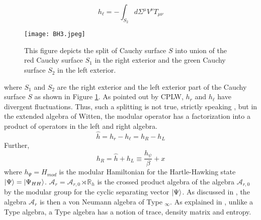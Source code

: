 \documentclass[12pt]{article}
\DeclarePairedDelimiter\ket{\lvert}{\rangle}
\newcommand{\RomanNumeralCaps}[1]
    {\MakeUppercase{\romannumeral #1}}
\begin{document}
 \begin{equation}\label{II4}
 h_{\ell}=-\int_{S_2}d\Sigma^{\mu}V^{\nu} T_{\mu \nu}
 \end{equation}
\begin{figure}[h]
  \centering
  \texttt{[image: BH3.jpeg]}
  \caption{This figure depicts the split of Cauchy surface $S$ into union of the red Cauchy surface $S_1$ in the right exterior and the green Cauchy surface $S_2$  in the left exterior.}
  \label{fig:BH3}
\end{figure}
 where $S_1$ and $S_2$ are the right exterior and the left exterior part of the Cauchy surface $S$ as shown in Figure \ref{fig:BH3}.  As pointed out by CPLW, $ h_r$ and $h_\ell$ have divergent fluctuations. Thus, such a splitting is not true, strictly speaking \cite{EW3}, but in the extended algebra of Witten, the modular operator has a factorization into a product of operators in the left and right algebra.
   \begin{equation}\label{II5}
   \hat{h}= h_r - h_{\ell} =  h_R -h_L
   \end{equation}
    Further,
  \begin{equation}\label{II7}
  h_{R}= \hat{h}+h_{L}\equiv \frac{h_{\psi}}{\beta}+ x
  \end{equation}
where $h_{\Psi}= H_{mod}$ is the modular Hamiltonian for the Hartle-Hawking state $\ket{\Psi}= \ket{\Psi_{HH}}$.  $\mathcal{A}_{r}= \mathcal{A}_{r,0} \rtimes \mathbb{R}_{h}$ is the crossed product algebra of the algebra $\mathcal{A}_{r,0}$ by the modular group for the cyclic separating vector $\ket{\Psi}$. As discussed in \cite{EW3}, the algebra $\mathcal{A}_{r}$ is then a von Neumann algebra of  Type \RomanNumeralCaps {2}$_\infty$.  As explained in \cite{EW3}, unlike a Type \RomanNumeralCaps {3} algebra, a Type \RomanNumeralCaps {2} algebra has a notion of trace, density matrix and entropy.
\end{document}
